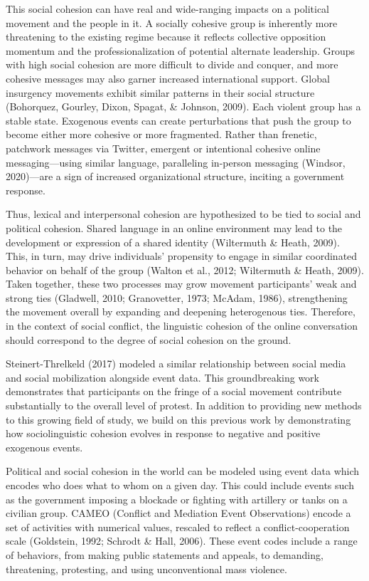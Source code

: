 \documentclass[
  english,
  man]{apa6}
\begin{document}
This social cohesion can have real and wide-ranging impacts on a political
movement and the people in it. A socially cohesive group is inherently more
threatening to the existing regime because it reflects collective opposition
momentum and the professionalization of potential alternate leadership. Groups
with high social cohesion are more difficult to divide and conquer, and more
cohesive messages may also garner increased international support. Global
insurgency movements exhibit similar patterns in their social structure
(Bohorquez, Gourley, Dixon, Spagat, \& Johnson, 2009). Each violent group has a stable state. Exogenous events
can create perturbations that push the group to become either more cohesive or
more fragmented. Rather than frenetic, patchwork messages via Twitter, emergent
or intentional cohesive online messaging---using similar language, paralleling
in-person messaging (Windsor, 2020)---are a sign of increased organizational
structure, inciting a government response.

Thus, lexical and interpersonal cohesion are hypothesized to be tied to social
and political cohesion. Shared language in an online environment may lead to the
development or expression of a shared identity (Wiltermuth \& Heath, 2009). This,
in turn, may drive individuals' propensity to engage in similar coordinated
behavior on behalf of the group (Walton et al., 2012; Wiltermuth \& Heath, 2009).
Taken together, these two processes may grow movement participants' weak and
strong ties (Gladwell, 2010; Granovetter, 1973; McAdam, 1986), strengthening the movement overall by expanding and
deepening heterogenous ties. Therefore,
in the context of social conflict, the linguistic cohesion
of the online conversation should correspond to the degree of
social cohesion on the ground.

Steinert-Threlkeld (2017) modeled a similar relationship
between social media and social mobilization alongside event data. This
groundbreaking work demonstrates that participants on the fringe of a social
movement contribute substantially to the overall level of protest. In addition
to providing new methods to this growing field of study, we build on this
previous work by demonstrating how sociolinguistic cohesion evolves in
response to negative and positive exogenous events.

Political and social cohesion in the world can be modeled using event data which
encodes who does what to whom on a given day. This could include events such as
the government imposing a blockade or fighting with artillery or tanks on
a civilian group. CAMEO (Conflict and Mediation Event Observations) encode
a set of activities with numerical values, rescaled to reflect a
conflict-cooperation scale (Goldstein, 1992; Schrodt \& Hall, 2006). These event
codes include a range of behaviors, from making public statements and appeals,
to demanding, threatening, protesting, and using unconventional mass violence.
\end{document}
